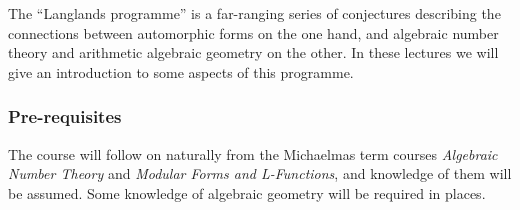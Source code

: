 \documentclass[a4paper]{article}
\begin{document}
\maketitle
{\small
\setlength{\parindent}{0em}
\setlength{\parskip}{1em}
The ``Langlands programme'' is a far-ranging series of conjectures describing the connections between automorphic forms on the one hand, and algebraic number theory and arithmetic algebraic geometry on the other. In these lectures we will give an introduction to some aspects of this programme.

\subsubsection*{Pre-requisites}
The course will follow on naturally from the Michaelmas term courses \emph{Algebraic Number Theory} and \emph{Modular Forms and L-Functions}, and knowledge of them will be assumed. Some knowledge of algebraic geometry will be required in places.
}
\tableofcontents

\printindex
\end{document}

